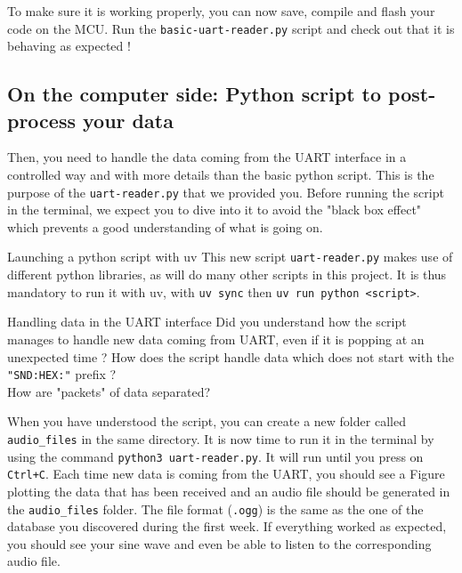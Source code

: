 \noindent To make sure it is working properly, you can now save, compile and flash your code on the MCU. Run the \texttt{basic-uart-reader.py} script and check out that it is behaving as expected !

\subsection*{On the computer side: Python script to post-process your data}

Then, you need to handle the data coming from the UART interface in a controlled way and with more details than the basic python script. This is the purpose of the \texttt{uart-reader.py} that we provided you. Before running the script in the terminal, we expect you to dive into it to avoid the "black box effect" which prevents a good understanding of what is going on.

\begin{bclogo}[couleur = gray!20, arrondi = 0.2, logo=\bcattention]{Launching a python script with uv}
This new script \texttt{uart-reader.py} makes use of different python libraries, as will do many other scripts in this project. It is thus mandatory to run it with uv, with \texttt{uv sync} then \texttt{uv run python <script>}.
\end{bclogo}

\begin{bclogo}[couleur = gray!20, arrondi = 0.2, logo=\bcquestion]{Handling data in the UART interface}
Did you understand how the script manages to handle new data coming from UART, even if it is popping at an unexpected time ? How does the script handle data which does not start with the \texttt{"SND:HEX:"} prefix ? \\

\noindent How are "packets" of data separated?
\end{bclogo}

\noindent When you have understood the script, you can create a new folder called \texttt{audio\_files} in the same directory. It is now time to run it in the terminal by using the command \texttt{python3 uart-reader.py}. It will run until you press on \texttt{Ctrl+C}. Each time new data is coming from the UART, you should see a Figure plotting the data that has been received and an audio file should be generated in the \texttt{audio\_files} folder. The file format (\texttt{.ogg}) is the same as the one of the database you discovered during the first week. If everything worked as expected, you should see your sine wave and even be able to listen to the corresponding audio file.

